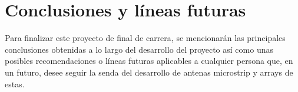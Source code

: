 
\chapter{Conclusiones y líneas futuras}
\label{conclusiones}

\par Para finalizar este proyecto de final de carrera, se mencionarán las principales conclusiones obtenidas a lo largo del desarrollo del proyecto así como unas posibles recomendaciones o líneas futuras aplicables a cualquier persona que, en un futuro, desee seguir la senda del desarrollo de antenas microstrip y arrays de estas.

